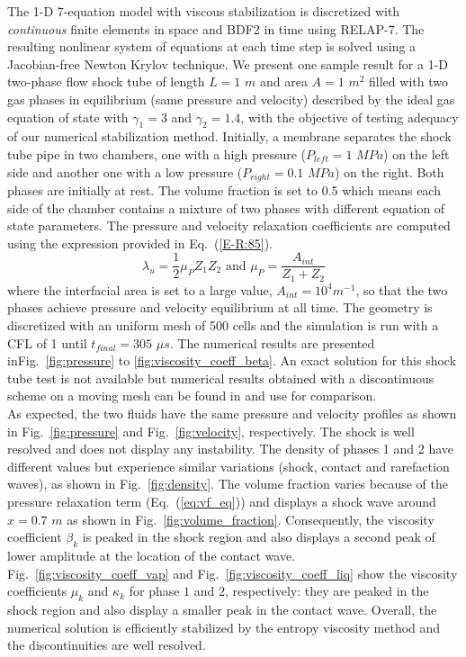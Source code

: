 \documentclass{anstrans}
\newcommand{\eqt}[1]{Eq.~(\ref{#1})}                     %
\newcommand{\fig}[1]{Fig.~\ref{#1}}                      %
\begin{document}
The 1-D 7-equation model with viscous stabilization is discretized with {\it continuous} finite elements in space and BDF2 in time using RELAP-7. The resulting nonlinear system of equations at each time step is solved using a Jacobian-free Newton Krylov technique. We present one sample result for a 1-D two-phase flow shock tube of length $L=1$ $m$ and area $A=1$ $m^2$ filled with two gas phases in equilibrium (same pressure and velocity) described by the ideal gas equation of state with $\gamma_1 = 3$ and $\gamma_2 = 1.4$, with the objective of testing adequacy of our numerical stabilization method. Initially, a membrane separates the shock tube pipe in two chambers, one with a high pressure ($P_{left} = 1$ $MPa$) on the left side and another one with a low pressure ($P_{right} = 0.1$ $MPa$) on the right. Both phases are initially at rest. The volume fraction is set to 0.5 which means each side of the chamber contains a mixture of two phases with different equation of state parameters. The pressure and velocity relaxation coefficients are computed using the expression provided in \eqt{E-R:85}. 
%
\begin{equation}\label{E-R:85}
  \lambda_u = \frac{1}{2} \mu_P Z_{1} Z_{2} \text{ and }
  \mu_P = \frac{A_{int}}{Z_{1}+Z_{2}} 
\end{equation}
%
where the interfacial area is set to a large value, $A_{int} = 10^4 m^{-1}$, so that the two phases achieve pressure and velocity equilibrium at all time. The geometry is discretized with an uniform mesh of 500 cells and the simulation is run with a CFL of 1 until $t_{final} = 305$ $\mu s$. The numerical results are presented in\fig{fig:pressure} to \ref{fig:viscosity_coeff_beta}. An exact solution for this shock tube test is not available but numerical results obtained with a discontinuous scheme on a moving mesh can be found in \cite{Saurel_2007} and use for comparison.\\

As expected, the two fluids have the same pressure and velocity profiles as shown in \fig{fig:pressure} and \fig{fig:velocity}, respectively. The shock is well resolved and does not display any instability. The density of phases 1 and 2 have different values but experience similar variations (shock, contact and rarefaction waves), as shown in \fig{fig:density}. The volume fraction varies because of the pressure relaxation term (\eqt{eq:vf_eq}) and displays a shock wave around $x=0.7$ $m$ as shown in \fig{fig:volume_fraction}. Consequently, the viscosity coefficient $\beta_k$ is peaked in the shock region and also displays a second peak of lower amplitude at the location of the contact wave. \fig{fig:viscosity_coeff_vap} and \fig{fig:viscosity_coeff_liq} show the viscosity coefficients $\mu_k$ and $\kappa_k$ for phase $1$ and $2$, respectively: they are peaked in the shock region and also display a smaller peak in the contact wave. Overall, the numerical solution is efficiently stabilized by the entropy viscosity method and the discontinuities are well resolved. %
\end{document}
